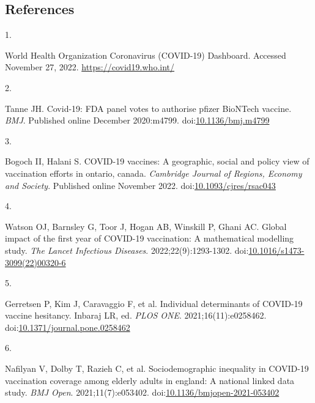 \documentclass[
  letterpaper,
  DIV=11,
  numbers=noendperiod]{scrartcl}
\newlength{\cslhangindent}
\newlength{\csllabelwidth}
\newlength{\cslentryspacingunit} %
\newenvironment{CSLReferences}[2] %
 {%
  \setlength{\parindent}{0pt}
  \ifodd #1
  \let\oldpar\par
  \def\par{\hangindent=\cslhangindent\oldpar}
  \fi
  \setlength{\parskip}{#2\cslentryspacingunit}
 }%
 {}
\newcommand{\CSLLeftMargin}[1]{\parbox[t]{\csllabelwidth}{#1}}
\newcommand{\CSLRightInline}[1]{\parbox[t]{\linewidth - \csllabelwidth}{#1}\break}
\begin{document}
\FloatBarrier

\hypertarget{references}{%
\subsection{References}\label{references}}

\hypertarget{refs}{}
\begin{CSLReferences}{0}{0}
\leavevmode{}%
\CSLLeftMargin{1. }%
\CSLRightInline{{World Health Organization Coronavirus (COVID-19)
Dashboard}. Accessed November 27, 2022. \url{https://covid19.who.int/}}

\leavevmode{}%
\CSLLeftMargin{2. }%
\CSLRightInline{Tanne JH. Covid-19: {FDA} panel votes to authorise
pfizer {BioNTech} vaccine. \emph{{BMJ}}. Published online December
2020:m4799.
doi:\href{https://doi.org/10.1136/bmj.m4799}{10.1136/bmj.m4799}}

\leavevmode{}%
\CSLLeftMargin{3. }%
\CSLRightInline{Bogoch II, Halani S. {COVID}-19 vaccines: A geographic,
social and policy view of vaccination efforts in ontario, canada.
\emph{Cambridge Journal of Regions, Economy and Society}. Published
online November 2022.
doi:\href{https://doi.org/10.1093/cjres/rsac043}{10.1093/cjres/rsac043}}

\leavevmode{}%
\CSLLeftMargin{4. }%
\CSLRightInline{Watson OJ, Barnsley G, Toor J, Hogan AB, Winskill P,
Ghani AC. Global impact of the first year of {COVID}-19 vaccination: A
mathematical modelling study. \emph{The Lancet Infectious Diseases}.
2022;22(9):1293-1302.
doi:\href{https://doi.org/10.1016/s1473-3099(22)00320-6}{10.1016/s1473-3099(22)00320-6}}

\leavevmode{}%
\CSLLeftMargin{5. }%
\CSLRightInline{Gerretsen P, Kim J, Caravaggio F, et al. Individual
determinants of {COVID}-19 vaccine hesitancy. Inbaraj LR, ed.
\emph{{PLOS} {ONE}}. 2021;16(11):e0258462.
doi:\href{https://doi.org/10.1371/journal.pone.0258462}{10.1371/journal.pone.0258462}}

\leavevmode{}%
\CSLLeftMargin{6. }%
\CSLRightInline{Nafilyan V, Dolby T, Razieh C, et al. Sociodemographic
inequality in {COVID}-19 vaccination coverage among elderly adults in
england: A national linked data study. \emph{{BMJ} Open}.
2021;11(7):e053402.
doi:\href{https://doi.org/10.1136/bmjopen-2021-053402}{10.1136/bmjopen-2021-053402}}


\end{CSLReferences}
\end{document}
